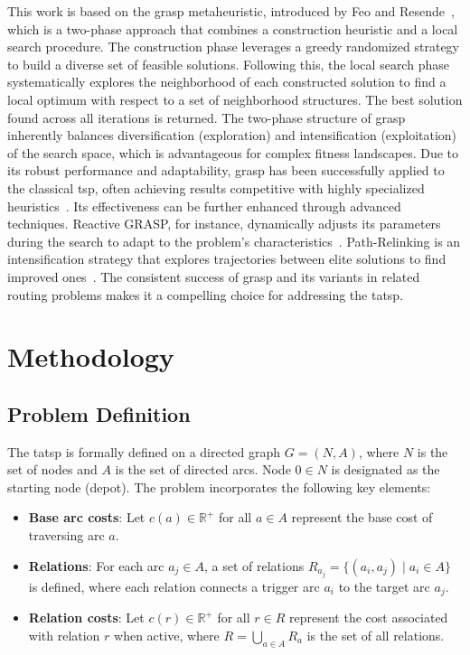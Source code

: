 \documentclass[twocolumn, switch]{article} %
\begin{document}
This work is based on the \gls{grasp} metaheuristic, introduced by Feo and Resende~\cite{Feo1995}, which is a two-phase approach that combines a construction heuristic and a local search procedure.
The construction phase leverages a greedy randomized strategy to build a diverse set of feasible solutions. Following this, the local search phase systematically explores the neighborhood of each constructed solution to find a local optimum with respect to a set of neighborhood structures.
The best solution found across all iterations is returned. The two-phase structure of \gls{grasp} inherently balances diversification (exploration) and intensification (exploitation) of the search space, which is advantageous for complex fitness landscapes.
Due to its robust performance and adaptability, \gls{grasp} has been successfully applied to the classical \gls{tsp}, often achieving results competitive with highly specialized heuristics~\cite{Oliveira2004}. 
Its effectiveness can be further enhanced through advanced techniques. Reactive GRASP, for instance, dynamically adjusts its parameters during the search to adapt to the problem's characteristics~\cite{Prais2000}. 
Path-Relinking is an intensification strategy that explores trajectories between elite solutions to find improved ones~\cite{Resende2019}. The consistent success of \gls{grasp} and its variants in related routing problems makes it a compelling choice for addressing the \gls{tatsp}.

\section{Methodology}

\subsection{Problem Definition}

The \gls{tatsp} is formally defined on a directed graph $G = (N, A)$, where $N$ is the set of nodes and $A$ is the set of directed arcs. Node $0 \in N$ is designated as the starting node (depot). The problem incorporates the following key elements:

\begin{itemize}
\item \textbf{Base arc costs}: Let $c(a) \in \mathbb{R}^+$ for all $a \in A$ represent the base cost of traversing arc $a$.
\item \textbf{Relations}: For each arc $a_j \in A$, a set of relations $R_{a_j} = \{(a_i, a_j) \mid a_i \in A\}$ is defined, where each relation connects a trigger arc $a_i$ to the target arc $a_j$.
\item \textbf{Relation costs}: Let $c(r) \in \mathbb{R}^+$ for all $r \in R$ represent the cost associated with relation $r$ when active, where $R = \bigcup_{a \in A} R_a$ is the set of all relations.
\end{itemize}
\end{document}
